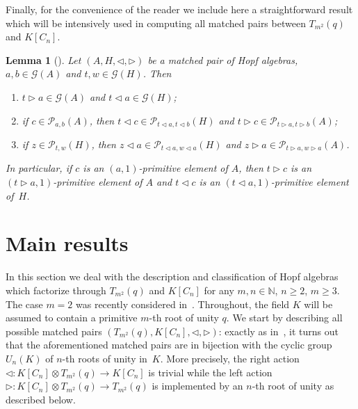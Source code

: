 \documentclass[pdftex]{sigma}
\numberwithin{equation}{section}
\newtheorem{Lemma}[Theorem]{Lemma}
\begin{document}
Finally, for the convenience of the reader we include here a straightforward result which will be intensively used in computing all matched pairs between $T_{m^{2}}(q)$ and $K[C_{n}]$.
\begin{Lemma}[{\cite[Lemma 4.1]{abm}}]\label{primitive}
Let $(A, H, \triangleleft, \triangleright)$ be a matched pair of Hopf algebras, $a, b \in \mathcal{G}(A)$ and $t, w\in \mathcal{G}(H)$. Then
\begin{enumerate}\itemsep=0pt
\item[$(1)$] $t \triangleright a \in \mathcal{G}(A)$ and $t\triangleleft a \in \mathcal{G}(H)$;

\item[$(2)$] if $c \in \mathcal{P}_{a, b}(A)$, then $t \triangleleft c \in \mathcal{P}_{t\triangleleft a, t\triangleleft b} (H)$ and
$t \triangleright c \in \mathcal{P}_{t\triangleright a, t\triangleright b} (A)$;

\item[$(3)$] if $z \in \mathcal{P}_{t, w}(H)$, then $z \triangleleft a \in \mathcal{P}_{t\triangleleft a, w\triangleleft a} (H)$ and $z \triangleright a \in \mathcal{P}_{t\triangleright a, w\triangleright a} (A)$.
\end{enumerate}
In particular, if $c$ is an $(a, 1)$-primitive element of $A$, then $t \triangleright c$ is an $(t\triangleright a, 1)$-primitive element of $A$ and $t \triangleleft c$ is an $(t\triangleleft a, 1)$-primitive element of~$H$.
\end{Lemma}

\section{Main results}\label{2}

In this section we deal with the description and classification of Hopf algebras which factorize through $T_{m^{2}}(q)$ and $K[C_{n}]$ for any $m, n \in \mathbb{N}$, $n \geqslant 2$, $m \geqslant 3$. The case $m = 2$ was recently considered in~\cite{abm}. Throughout, the field $K$ will be assumed to contain a primitive $m$-th root of unity $q$. We start by describing all possible matched pairs $(T_{m^{2}}(q), K[C_n], \triangleleft,
\triangleright)$: exactly as in~\cite{abm}, it turns out that the aforementioned matched pairs are in bijection with the cyclic group~$U_n (K)$ of
$n$-th roots of unity in~$K$. More precisely, the right action $\triangleleft \colon K[C_{n}] \otimes T_{m^{2}}(q) \to K[C_{n}]$ is trivial while
the left action $\triangleright \colon K[C_{n}] \otimes T_{m^{2}}(q) \to T_{m^{2}}(q)$ is implemented by an $n$-th root of unity as described below.
\end{document}
